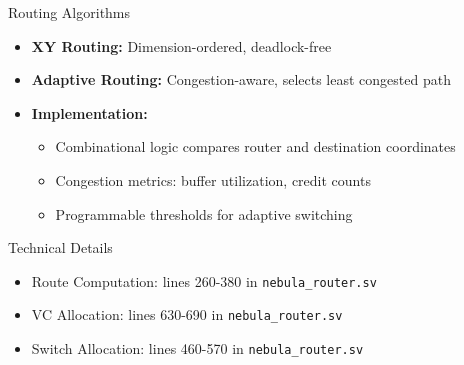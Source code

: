 \documentclass{beamer}
\begin{document}
\begin{frame}{Routing Algorithms}
  \begin{itemize}
    \item \textbf{XY Routing:} Dimension-ordered, deadlock-free
    \item \textbf{Adaptive Routing:} Congestion-aware, selects least congested path
    \item \textbf{Implementation:}
      \begin{itemize}
        \item Combinational logic compares router and destination coordinates
        \item Congestion metrics: buffer utilization, credit counts
        \item Programmable thresholds for adaptive switching
      \end{itemize}
  \end{itemize}
  \begin{block}{Technical Details}
    \begin{itemize}
      \item Route Computation: lines 260-380 in \texttt{nebula\_router.sv}
      \item VC Allocation: lines 630-690 in \texttt{nebula\_router.sv}
      \item Switch Allocation: lines 460-570 in \texttt{nebula\_router.sv}
    \end{itemize}
  \end{block}
\end{frame}
\end{document}
